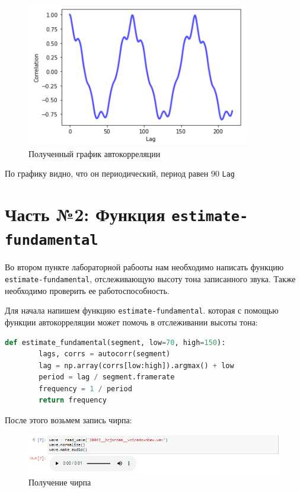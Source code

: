 \documentclass[a4paper]{article}
\begin{document}
            \begin{figure}[H]
                \centering
                \includegraphics{ex_1_segment.png}
                \caption{Полученный график автокорреляции}
                \label{fig:ex_1_segment}
            \end{figure}
            
            По графику видно, что он периодический, период равен 90 \texttt{Lag}
           
    
    \newpage
        \section{Часть №2: Функция \texttt{estimate-fundamental}}
            Во втором пункте лабораторной рабооты нам необходимо написать функцию \texttt{estimate-fundamental}, отслеживающую высоту тона записанного звука. Также необходимо проверить ее работоспособность.
            
            Для начала напишем функцию \texttt{estimate-fundamental}. которая с помощью функции автокорреляции может помочь в отслеживании высоты тона:
            
\begin{lstlisting}[language=Python, caption= Функция \texttt{estimate-fundamental}]
    def estimate_fundamental(segment, low=70, high=150):
        lags, corrs = autocorr(segment)
        lag = np.array(corrs[low:high]).argmax() + low
        period = lag / segment.framerate
        frequency = 1 / period
        return frequency
\end{lstlisting}
            
            После этого возьмем запись чирпа:
            
            \begin{figure}[H]
                \centering
                \includegraphics[width=\textwidth]{ex_2_audio.png}
                \caption{Получение чирпа}
                \label{fig:ex_2_audio}
            \end{figure}
            
\end{document}
